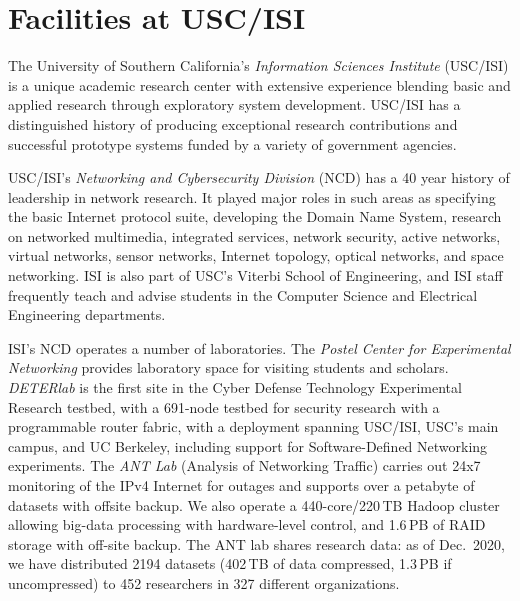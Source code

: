 \documentclass[11pt]{article}
\begin{document}
\section{Facilities at USC/ISI}

The University of Southern California's \emph{Information Sciences Institute}
(USC/ISI) is a unique academic research center with extensive
experience blending basic and applied research through
exploratory system development. USC/ISI has a distinguished history of
producing exceptional research contributions and successful prototype
systems funded by a variety of government agencies.

USC/ISI's \emph{Networking and Cybersecurity Division} (NCD) has a 40 year history of
leadership in network research.  It played major roles in such areas
as specifying the basic Internet protocol suite, developing the Domain
Name System, research on networked multimedia, integrated services,
network security, active networks,
virtual networks, sensor networks, Internet topology, optical
networks, and space networking.
%
ISI is also part of USC's Viterbi School of Engineering,
and ISI staff frequently teach and advise students in the
Computer Science and Electrical Engineering departments.

ISI's NCD operates a number of laboratories.
The \emph{Postel Center for Experimental Networking}
  provides laboratory space for visiting students and scholars.
\emph{DETERlab} is the first
site in the Cyber Defense Technology Experimental Research testbed,
with a 691-node testbed for security research with a programmable
router fabric, with a deployment spanning USC/ISI, USC's main campus, and UC Berkeley,
  including support for Software-Defined Networking experiments.
The \emph{ANT Lab} (Analysis of Networking Traffic)
  carries out 24x7 monitoring of the IPv4 Internet for outages
  and supports over a petabyte of datasets with offsite backup.
We also operate
  a 440-core/220\,TB Hadoop cluster   %
  allowing big-data processing with hardware-level control,
  and 1.6\,PB of RAID storage with off-site backup.
The ANT lab shares research data:
  as of Dec.~2020, we have distributed 2194 datasets 
  (402\,TB of data compressed, %
  1.3\,PB if uncompressed) %
    to 452 researchers in 327 different organizations.
\end{document}
